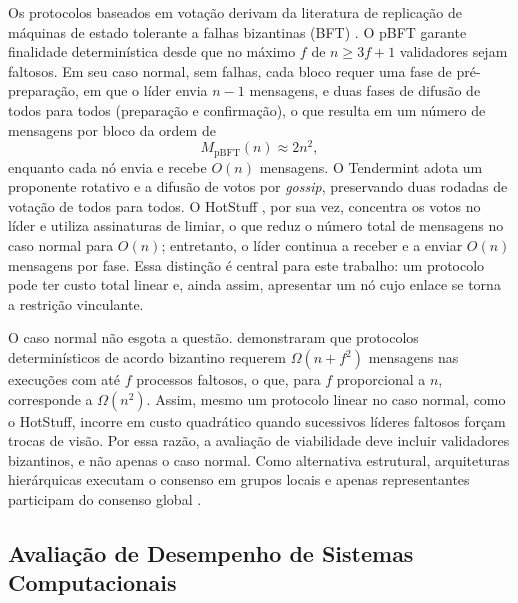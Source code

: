 Os protocolos baseados em votação derivam da literatura de replicação de máquinas de estado tolerante a falhas bizantinas (BFT) \citep{Vukolic2015}. O pBFT \citep{Castro1999} garante finalidade determinística desde que no máximo $f$ de $n \geq 3f+1$ validadores sejam faltosos. Em seu caso normal, sem falhas, cada bloco requer uma fase de pré-preparação, em que o líder envia $n-1$ mensagens, e duas fases de difusão de todos para todos (preparação e confirmação), o que resulta em um número de mensagens por bloco da ordem de
\begin{equation}
M_{\mathrm{pBFT}}(n) \approx 2n^{2},
\label{eq:mpbft}
\end{equation}
enquanto cada nó envia e recebe $O(n)$ mensagens. O Tendermint \citep{Buchman2018} adota um proponente rotativo e a difusão de votos por \textit{gossip}, preservando duas rodadas de votação de todos para todos. O HotStuff \citep{Yin2019}, por sua vez, concentra os votos no líder e utiliza assinaturas de limiar, o que reduz o número total de mensagens no caso normal para $O(n)$; entretanto, o líder continua a receber e a enviar $O(n)$ mensagens por fase. Essa distinção é central para este trabalho: um protocolo pode ter custo total linear e, ainda assim, apresentar um nó cujo enlace se torna a restrição vinculante.

O caso normal não esgota a questão. \citet{Dolev1985} demonstraram que protocolos determinísticos de acordo bizantino requerem $\Omega(n + f^{2})$ mensagens nas execuções com até $f$ processos faltosos, o que, para $f$ proporcional a $n$, corresponde a $\Omega(n^{2})$. Assim, mesmo um protocolo linear no caso normal, como o HotStuff, incorre em custo quadrático quando sucessivos líderes faltosos forçam trocas de visão. Por essa razão, a avaliação de viabilidade deve incluir validadores bizantinos, e não apenas o caso normal. Como alternativa estrutural, arquiteturas hierárquicas executam o consenso em grupos locais e apenas representantes participam do consenso global \citep{Amir2010}.

\subsection{Avaliação de Desempenho de Sistemas Computacionais}

